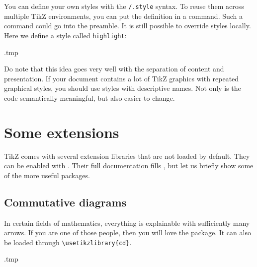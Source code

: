 You can define your own styles with the \verb|/.style| syntax.
To reuse them across multiple TikZ environments,
you can put the definition in a  command.
Such a command could go into the preamble.
It is still possible to override styles locally.
Here we define a style called \verb|highlight|:
%
\begin{VerbatimOut}{\jobname.tmp}
\centering
{}
\newcommand{\dogfile}{pictures/TheDogs.jpg}

\end{VerbatimOut}
\ShowExampleBelow[2]


\begin{practices}
Do note that this idea goes very well with the separation of content and presentation.
If your document contains a lot of TikZ graphics with repeated graphical styles,
you should use styles with descriptive names.
Not only is the code semantically meaningful, but also easier to change.
\end{practices}


%
%
\section{Some extensions}

TikZ comes with several extension libraries that are not loaded by default.
They can be enabled with .
Their full documentation fills \cite[Section~V]{tikz},
but let us briefly show some of the more useful packages.


%
\subsection{Commutative diagrams}\label{sec:tikz-cd}

In certain fields of mathematics, everything is explainable with sufficiently many arrows.
If you are one of those people, then you will love the  package.
It can also be loaded through \verb|\usetikzlibrary{cd}|.
%
\begin{VerbatimOut}{\jobname.tmp}
\centering

\end{VerbatimOut}
\ShowExampleBelow[2]

